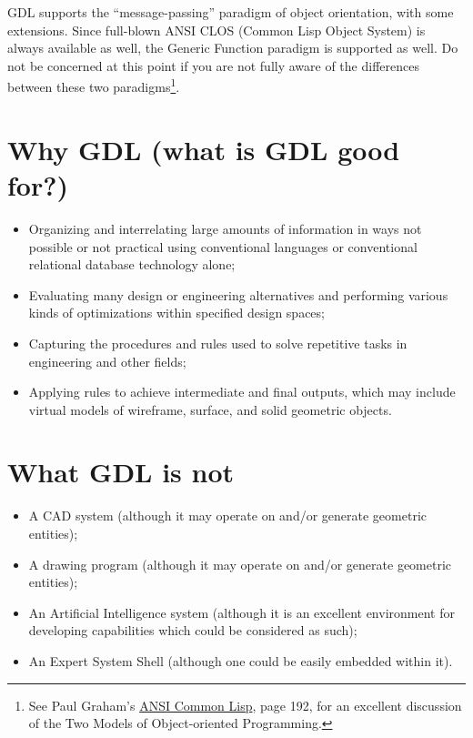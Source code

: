 \documentclass [11pt]{book}
\begin{document}
GDL supports the ``message-passing'' paradigm of object orientation, with some extensions. Since
full-blown ANSI CLOS (Common Lisp Object System) is always available as well, the Generic Function paradigm 
is supported as well. Do not be concerned at this point if you are not fully aware of the differences 
between these two paradigms\footnote{See Paul Graham's 
\underline{ANSI Common Lisp}, page 192, for an excellent discussion of the Two Models 
of Object-oriented Programming.}.

\section{Why GDL (what is GDL good for?)}

\label{sec:whygdl(whatisgdlgoodfor?)}



\begin{itemize}

\item Organizing and interrelating large amounts of information
in ways not possible or not practical using conventional languages or 
conventional relational database technology alone;

\item Evaluating many design or engineering alternatives and 
performing various kinds of optimizations within specified design
spaces;

\item Capturing the procedures and rules used to solve repetitive
tasks in engineering and other fields;

\item Applying rules to achieve intermediate and final 
outputs, which may include virtual models of wireframe, surface,
and solid geometric objects.

\end{itemize}



\section{What GDL is not}

\label{sec:whatgdlisnot}



\begin{itemize}

\item A CAD system (although it may operate on and/or generate geometric entities);

\item A drawing program (although it may operate on and/or generate geometric entities);

\item An Artificial Intelligence system (although it is an excellent environment for developing 
capabilities which could be considered as such);

\item An Expert System Shell (although one could be easily embedded within it).

\end{itemize}
\end{document}

